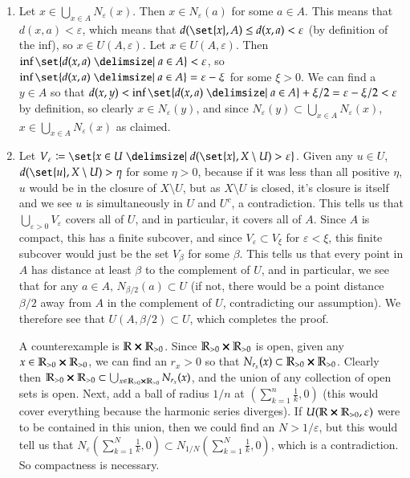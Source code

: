 \documentclass[12pt]{article}
\def\mbb#1{\mathbb{#1}}
\def \R{\mbb{R}}
\def \ve{\varepsilon}
\theoremstyle{definition}
\theoremstyle{remark}
\begin{document}
\begin{enumerate}[leftmargin=\labelsep]
\begin{enumerate}
			\item Let $x \in \bigcup_{x \in A} N_\ve(x)$. Then $x \in N_\ve(a)$ for some $a \in A$. This means that $d(x, a) < \ve$, which means that $d(\set{x}, A) \leq d(x, a) < \ve$ (by definition of the inf), so $x \in U(A, \ve)$. Let $x \in U(A, \ve)$. Then $\inf\set{d(x, a) \given a \in A} < \ve$, so $\inf\set{d(x, a) \given a \in A} = \ve - \xi$ for some $\xi > 0$. We can find a $y \in A$ so that $d(x, y) < \inf\set{d(x, a) \given a \in A} + \xi / 2 = \ve - \xi / 2 < \ve$ by definition, so clearly $x \in N_\ve(y)$, and since $N_\ve(y) \subset \bigcup_{x \in A} N_\ve(x)$, $x \in \bigcup_{x \in A} N_\ve(x)$ as claimed.
			
			\item Let $V_\ve \coloneqq \set{x \in U \given d(\set{x}, X \setminus U) > \ve}$. Given any $u \in U$, $d(\set{u}, X \setminus U) > \eta$ for some $\eta > 0$, because if it was less than all positive $\eta$, $u$ would be in the closure of $X \setminus U$, but as $X \setminus U$ is closed, it's closure is itself and we see $u$ is simultaneously in $U$ and $U^c$, a contradiction. This tells us that $\bigcup_{\ve > 0} V_\ve$ covers all of $U$, and in particular, it covers all of $A$. Since $A$ is compact, this has a finite subcover, and since $V_\ve \subset V_\xi$ for $\ve < \xi$, this finite subcover would just be the set $V_\beta$ for some $\beta$. This tells us that every point in $A$ has distance at least $\beta$ to the complement of $U$, and in particular, we see that for any $a \in A$, $N_{\beta/2}(a) \subset U$ (if not, there would be a point distance $\beta/2$ away from $A$ in the complement of $U$, contradicting our assumption). We therefore see that $U(A, \beta/2) \subset U$, which completes the proof.
			
			A counterexample is $\R \cross \R_{>0}$. Since $\R_{>0} \cross \R_{>0}$ is open, given any $x \in \R_{>0} \cross \R_{>0}$, we can find an $r_x > 0$ so that $N_{r_x}(x) \subset \R_{>0} \cross \R_{>0}$. Clearly then $\R_{>0} \cross \R_{>0} \subset \bigcup_{x \in \R_{>0} \cross \R_{>0}} N_{r_x}(x)$, and the union of any collection of open sets is open. Next, add a ball of radius $1/n$ at $(\sum_{k=1}^{n} \frac 1k, 0)$ (this would cover everything because the harmonic series diverges). If $U(\R \cross \R_{>0}, \ve)$ were to be contained in this union, then we could find an $N > 1/\ve$, but this would tell us that $N_\ve(\sum_{k=1}^{N} \frac 1k, 0) \subset N_{1/N}(\sum_{k=1}^{N} \frac 1k, 0)$, which is a contradiction. So compactness is necessary.
		\end{enumerate}
	

\end{enumerate}
\end{document}
